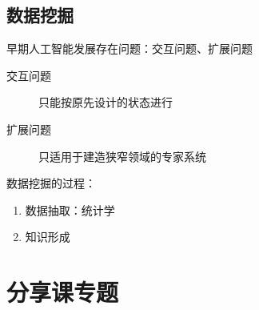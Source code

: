 \subsection{数据挖掘}%
\label{sub:数据挖掘}
\begin{notation}
    早期人工智能发展存在问题：交互问题、扩展问题
    \begin{description}
        \item[交互问题] 只能按原先设计的状态进行
        \item [扩展问题] 只适用于建造狭窄领域的专家系统
    \end{description}
\end{notation}
\begin{notation}
    数据挖掘的过程：
    \begin{enumerate}
        \item 数据抽取：统计学
        \item 知识形成
    \end{enumerate}
\end{notation}
\section*{分享课专题}%
\label{sec:分享课专题}

